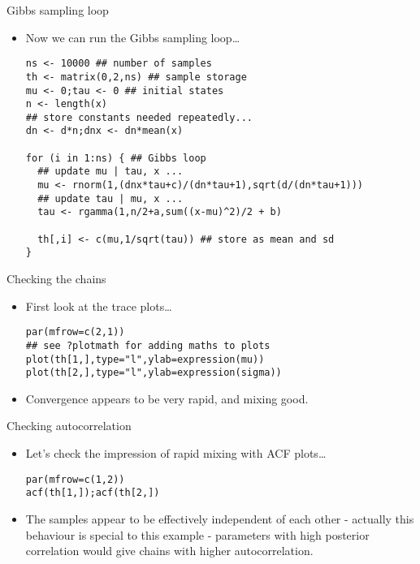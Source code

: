 \documentclass{beamer}
\newcommand{\eps}[3]
{{\begin{center}
 \rotatebox{#1}{\scalebox{#2}{\texttt{[image: \#3]}}}
 \end{center}}
}
\begin{document}
\begin{frame}[fragile]{Gibbs sampling loop}
\begin{itemize}
\item Now we can run the Gibbs sampling loop\ldots

{\scriptsize \begin{verbatim}
ns <- 10000 ## number of samples
th <- matrix(0,2,ns) ## sample storage
mu <- 0;tau <- 0 ## initial states
n <- length(x) 
## store constants needed repeatedly...
dn <- d*n;dnx <- dn*mean(x) 

for (i in 1:ns) { ## Gibbs loop
  ## update mu | tau, x ... 
  mu <- rnorm(1,(dnx*tau+c)/(dn*tau+1),sqrt(d/(dn*tau+1)))
  ## update tau | mu, x ... 
  tau <- rgamma(1,n/2+a,sum((x-mu)^2)/2 + b)
  
  th[,i] <- c(mu,1/sqrt(tau)) ## store as mean and sd
}
\end{verbatim}}
\end{itemize}
\end{frame}

\begin{frame}[fragile]{Checking the chains}
\begin{itemize}
\item First look at the trace plots\ldots
{\scriptsize \begin{verbatim}
par(mfrow=c(2,1))
## see ?plotmath for adding maths to plots
plot(th[1,],type="l",ylab=expression(mu))
plot(th[2,],type="l",ylab=expression(sigma))
\end{verbatim}}
\vspace*{-.5cm}
\eps{-90}{.4}{nh-trace.eps}
\item Convergence appears to be very rapid, and mixing good.
\end{itemize}
\end{frame}

\begin{frame}[fragile]{Checking autocorrelation}
\begin{itemize}
\item Let's check the impression of rapid mixing with ACF plots\ldots 
{\scriptsize \begin{verbatim}
par(mfrow=c(1,2))
acf(th[1,]);acf(th[2,])
\end{verbatim}}
\eps{-90}{.4}{nh-acf.eps}
\item The samples appear to be effectively independent of each other - actually this behaviour is special to this example - parameters with high posterior correlation would give chains with higher autocorrelation. 
\end{itemize}
\end{frame}
\end{document}
